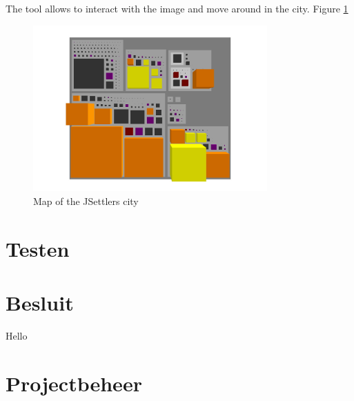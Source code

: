 \documentclass[pdftex12pt, a4paper]{article}
\begin{document}
The tool allows to interact with the image and move around in the city. Figure \ref{fig:codecityMap}

\begin{figure}
\begin{center}
\includegraphics[width=0.8\textwidth]{Image/Codecity/Codecity3.jpg}
\caption{Map of the JSettlers city}
\label{fig:codecityMap}
\end{center}
\end{figure}

\newpage

\section{Testen}

\newpage

\section{Besluit}

Hello 


\newpage

\section{Projectbeheer}
\end{document}
